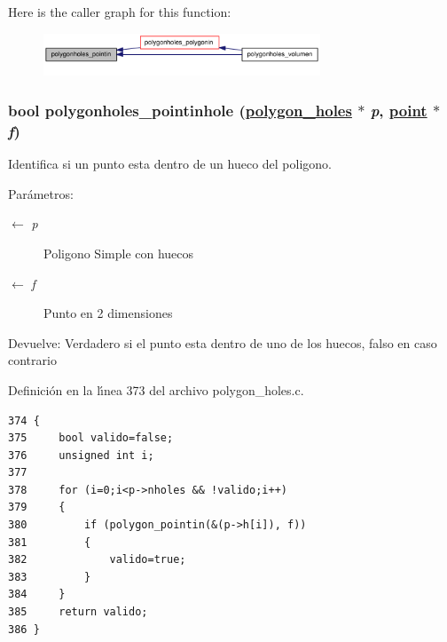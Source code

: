 Here is the caller graph for this function:\begin{figure}[H]
\begin{center}
\leavevmode
\includegraphics[width=234pt]{group__geometry_g35a6dd45f6d0cbed26ef8a69ed34a2e9_g35a6dd45f6d0cbed26ef8a69ed34a2e9_icgraph}
\end{center}
\end{figure}
\hypertarget{group__geometry_g139317720b027c782db9424256ba2c2d_g139317720b027c782db9424256ba2c2d}{
\subsubsection[polygonholes\_\-pointinhole]{\setlength{\rightskip}{0pt plus 5cm}bool polygonholes\_\-pointinhole (\hyperlink{struct__polygon__holes}{polygon\_\-holes} $\ast$ {\em p}, \hyperlink{struct__point}{point} $\ast$ {\em f})}}
\label{group__geometry_g139317720b027c782db9424256ba2c2d_g139317720b027c782db9424256ba2c2d}


Identifica si un punto esta dentro de un hueco del poligono.

\begin{Desc}
\item[Par\'{a}metros:]
\begin{description}
\item[\mbox{$\leftarrow$} {\em p}]Poligono Simple con huecos \item[\mbox{$\leftarrow$} {\em f}]Punto en 2 dimensiones \end{description}
\end{Desc}
\begin{Desc}
\item[Devuelve:]Verdadero si el punto esta dentro de uno de los huecos, falso en caso contrario \end{Desc}


Definici\'{o}n en la l\'{\i}nea 373 del archivo polygon\_\-holes.c.

\begin{Code}\begin{verbatim}374 {
375     bool valido=false;
376     unsigned int i;
377 
378     for (i=0;i<p->nholes && !valido;i++)
379     {
380         if (polygon_pointin(&(p->h[i]), f))
381         {
382             valido=true;
383         }
384     }
385     return valido;
386 }
\end{verbatim}\end{Code}




